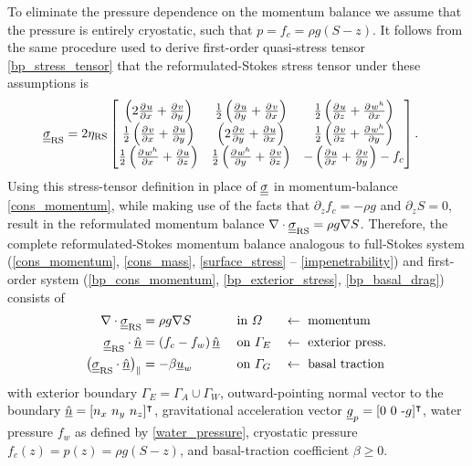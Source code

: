 To eliminate the pressure dependence on the momentum balance we assume that the pressure is entirely cryostatic, such that $p = f_c = \rho g (S - z)$.  It follows from the same procedure used to derive first-order quasi-stress tensor \cref{bp_stress_tensor} that the reformulated-Stokes stress tensor under these assumptions is 
{\footnotesize
\begin{align}
  \label{rs_stress_tensor}
  \underline{\underline{\sigma}}_{\text{RS}} &=
  2 \eta_{\text{RS}} 
  \begin{bmatrix}
       \left( 2\frac{\partial{^{}} u}{\partial x{^{}} } + \frac{\partial{^{}} v}{\partial y{^{}} } \right) & \frac{1}{2}\left( \frac{\partial{^{}} u}{\partial y{^{}} } + \frac{\partial{^{}} v}{\partial x{^{}} } \right) & \frac{1}{2} \left( \frac{\partial{^{}} u}{\partial z{^{}} } + \frac{\partial{^{}} w^h}{\partial x{^{}} } \right) \\
       \frac{1}{2}\left( \frac{\partial{^{}} v}{\partial x{^{}} } + \frac{\partial{^{}} u}{\partial y{^{}} } \right) & \left( 2\frac{\partial{^{}} v}{\partial y{^{}} } + \frac{\partial{^{}} u}{\partial x{^{}} } \right) & \frac{1}{2} \left( \frac{\partial{^{}} v}{\partial z{^{}} } + \frac{\partial{^{}} w^h}{\partial y{^{}} } \right) \\
       \frac{1}{2}\left( \frac{\partial{^{}} w^h}{\partial x{^{}} } + \frac{\partial{^{}} u}{\partial z{^{}} } \right) & \frac{1}{2}\left( \frac{\partial{^{}} w^h}{\partial y{^{}} } + \frac{\partial{^{}} v}{\partial z{^{}} } \right) & -\left( \frac{\partial{^{}} u}{\partial x{^{}} } + \frac{\partial{^{}} v}{\partial y{^{}} } \right) - f_c
     \end{bmatrix}.
\end{align}}
Using this stress-tensor definition in place of $\underline{\underline{\sigma}}$ in momentum-balance \cref{cons_momentum}, while making use of the facts that $\partial_z f_c = -\rho g$ and $\partial_z S = 0$, result in the reformulated momentum balance $\nabla \cdot \underline{\underline{\sigma}}_{\text{RS}} = \rho g \nabla S$.  Therefore, the complete reformulated-Stokes momentum balance analogous to full-Stokes system (\cref{cons_momentum}, \cref{cons_mass}, \cref{surface_stress} -- \cref{impenetrability}) and first-order system (\cref{bp_cons_momentum}, \cref{bp_exterior_stress}, \cref{bp_basal_drag}) consists of
{\small
\begin{align}
  \label{rs_cons_momentum}
  \nabla \cdot \underline{\underline{\sigma}}_{\text{RS}} &= \rho g \nabla S &&\text{ in } \varOmega &&\leftarrow \text{ momentum} \\
  \label{rs_exterior_stress}
  \underline{\underline{\sigma}}_{\text{RS}} \cdot \underline{\hat{n}} &= \left(f_c - f_w \right) \underline{\hat{n}} &&\text{ on } \varGamma_E &&\leftarrow \text{ exterior press.} \\
  \label{rs_basal_drag}
  \big( \underline{\underline{\sigma}}_{\text{RS}} \cdot \underline{\hat{n}} \big)_{\Vert} &= -\beta \underline{u}_w &&\text{ on } \varGamma_G &&\leftarrow \text{ basal traction }
\end{align}}
with exterior boundary $\Gamma_E = \Gamma_A \cup \Gamma_W$, outward-pointing normal vector to the boundary $\underline{\hat{n}} = [n_x\ n_y\ n_z]^\intercal$, gravitational acceleration vector $\underline{g}_p = [0\ 0\ \text{-}g]^\intercal$, water pressure $f_w$ as defined by \cref{water_pressure}, cryostatic pressure  $f_c(z) = p(z) = \rho g (S - z)$, and basal-traction coefficient $\beta \geq 0$.


